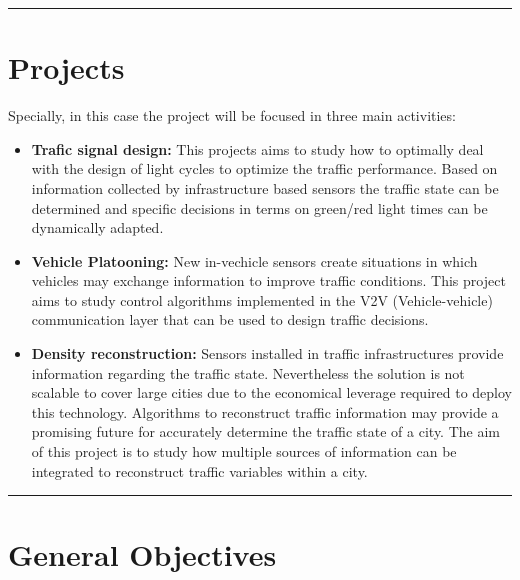\documentclass[]{book}
\providecommand{\tightlist}{%
  \setlength{\itemsep}{0pt}\setlength{\parskip}{0pt}}
\theoremstyle{definition}
\theoremstyle{definition}
\theoremstyle{definition}
\theoremstyle{remark}
\begin{document}
\begin{center}\rule{0.5\linewidth}{\linethickness}\end{center}

\hypertarget{projects}{%
\section*{Projects}\label{projects}}

Specially, in this case the project will be focused in three main
activities:

\begin{itemize}
\tightlist
\item
  \textbf{Trafic signal design:} This projects aims to study how to
  optimally deal with the design of light cycles to optimize the traffic
  performance. Based on information collected by infrastructure based
  sensors the traffic state can be determined and specific decisions in
  terms on green/red light times can be dynamically adapted.
\item
  \textbf{Vehicle Platooning:} New in-vechicle sensors create situations
  in which vehicles may exchange information to improve traffic
  conditions. This project aims to study control algorithms implemented
  in the V2V (Vehicle-vehicle) communication layer that can be used to
  design traffic decisions.
\item
  \textbf{Density reconstruction:} Sensors installed in traffic
  infrastructures provide information regarding the traffic state.
  Nevertheless the solution is not scalable to cover large cities due to
  the economical leverage required to deploy this technology. Algorithms
  to reconstruct traffic information may provide a promising future for
  accurately determine the traffic state of a city. The aim of this
  project is to study how multiple sources of information can be
  integrated to reconstruct traffic variables within a city.
\end{itemize}

\begin{center}\rule{0.5\linewidth}{\linethickness}\end{center}

\hypertarget{general-objectives}{%
\section*{General Objectives}\label{general-objectives}}
\end{document}
